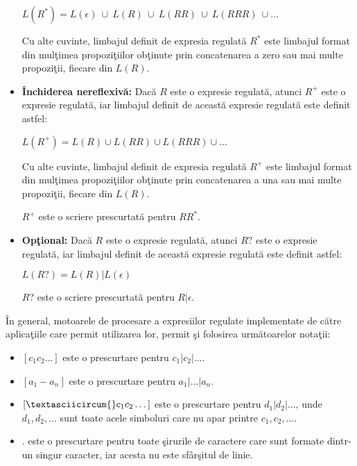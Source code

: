 \begin{definitie}
\begin{itemize}
\begin{center}
$L(R^*) = L(\epsilon)\ \cup \ L(R)\ \cup\ L(RR)\ \cup\ L(RRR)\ \cup \dots$
\end{center}

Cu alte cuvinte, limbajul definit de expresia regulată $R^*$ este limbajul format din mulţimea propoziţiilor obţinute prin concatenarea a zero sau mai multe propoziţii, fiecare din $L(R)$.

\item
\textbf{Închiderea nereflexivă:} Dacă $R$ este o expresie regulată, atunci $R^+$ este o expresie regulată, iar limbajul definit de această expresie regulată este definit astfel:

\begin{center}
$L(R^+) = L(R) \cup L(RR) \cup L(RRR) \cup \dots$
\end{center}

Cu alte cuvinte, limbajul definit de expresia regulată $R^+$ este limbajul format din mulţimea propoziţiilor obţinute prin concatenarea a una sau mai multe propoziţii, fiecare din $L(R)$.

$R^+$ este o scriere prescurtată pentru $RR^*$.

\item
\textbf{Opţional:} Dacă $R$ este o expresie regulată, atunci $R?$ este o expresie regulată, iar limbajul definit de această expresie regulată este definit astfel:

\begin{center}
$L(R?) = L(R) | L(\epsilon)$
\end{center}

$R?$ este o scriere prescurtată pentru $R|\epsilon$.
\end{itemize}
\end{definitie}

În general, motoarele de procesare a expresiilor regulate implementate de către aplicaţiile care permit utilizarea lor, permit şi folosirea următoarelor notaţii:

\begin{itemize}
\item
$[ c_{1} c_{2} \dots]$  este o prescurtare pentru  $c_{1} | c_{2} | \dots $.
\item
$[ a_{1}-a_{n} ]$ este o prescurtare pentru $a_{1} | \dots | a_{n} $.
\item
$[ \textasciicircum{} c_{1} c_{2}\dots]$ este o prescurtare pentru $d_{1}|d_{2}|\dots$, unde$ d_{1}, d_{2}, \dots$ sunt toate acele simboluri care nu apar printre $c_{1}, c_{2}, \dots$.
\item 
$.$ este o prescurtare pentru toate şirurile de caractere care sunt formate dintr-un singur caracter, iar acesta nu este sfârşitul de linie.
\end{itemize}

